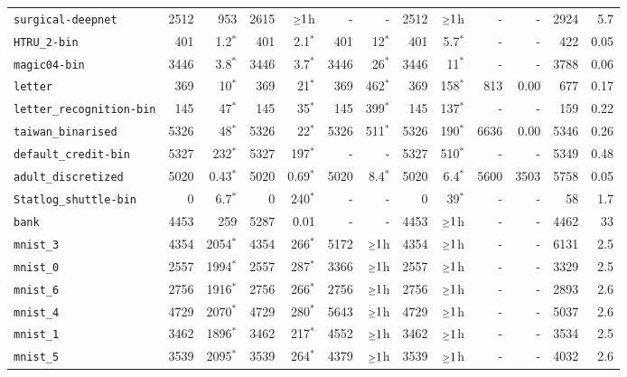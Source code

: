 \begin{tabular}{lrrrrrrrrrrrr}
\texttt{surgical-deepnet} & 2512 & 953 & 2615 & $\mathsmaller{\geq}1$h & - & - & 2512 & $\mathsmaller{\geq}1$h & - & - & 2924 & 5.7\\
\texttt{HTRU\_2-bin} & 401 & 1.2$^*$ & 401 & 2.1$^*$ & 401 & 12$^*$ & 401 & 5.7$^*$ & - & - & 422 & 0.05\\
\texttt{magic04-bin} & 3446 & 3.8$^*$ & 3446 & 3.7$^*$ & 3446 & 26$^*$ & 3446 & 11$^*$ & - & - & 3788 & 0.06\\
\texttt{letter} & 369 & 10$^*$ & 369 & 21$^*$ & 369 & 462$^*$ & 369 & 158$^*$ & 813 & 0.00 & 677 & 0.17\\
\texttt{letter\_recognition-bin} & 145 & 47$^*$ & 145 & 35$^*$ & 145 & 399$^*$ & 145 & 137$^*$ & - & - & 159 & 0.22\\
\texttt{taiwan\_binarised} & 5326 & 48$^*$ & 5326 & 22$^*$ & 5326 & 511$^*$ & 5326 & 190$^*$ & 6636 & 0.00 & 5346 & 0.26\\
\texttt{default\_credit-bin} & 5327 & 232$^*$ & 5327 & 197$^*$ & - & - & 5327 & 510$^*$ & - & - & 5349 & 0.48\\
\texttt{adult\_discretized} & 5020 & 0.43$^*$ & 5020 & 0.69$^*$ & 5020 & 8.4$^*$ & 5020 & 6.4$^*$ & 5600 & 3503 & 5758 & 0.05\\
\texttt{Statlog\_shuttle-bin} & 0 & 6.7$^*$ & 0 & 240$^*$ & - & - & 0 & 39$^*$ & - & - & 58 & 1.7\\
\texttt{bank} & 4453 & 259 & 5287 & 0.01 & - & - & 4453 & $\mathsmaller{\geq}1$h & - & - & 4462 & 33\\
\texttt{mnist\_3} & 4354 & 2054$^*$ & 4354 & 266$^*$ & 5172 & $\mathsmaller{\geq}1$h & 4354 & $\mathsmaller{\geq}1$h & - & - & 6131 & 2.5\\
\texttt{mnist\_0} & 2557 & 1994$^*$ & 2557 & 287$^*$ & 3366 & $\mathsmaller{\geq}1$h & 2557 & $\mathsmaller{\geq}1$h & - & - & 3329 & 2.5\\
\texttt{mnist\_6} & 2756 & 1916$^*$ & 2756 & 266$^*$ & 2756 & $\mathsmaller{\geq}1$h & 2756 & $\mathsmaller{\geq}1$h & - & - & 2893 & 2.6\\
\texttt{mnist\_4} & 4729 & 2070$^*$ & 4729 & 280$^*$ & 5643 & $\mathsmaller{\geq}1$h & 4729 & $\mathsmaller{\geq}1$h & - & - & 5037 & 2.6\\
\texttt{mnist\_1} & 3462 & 1896$^*$ & 3462 & 217$^*$ & 4552 & $\mathsmaller{\geq}1$h & 3462 & $\mathsmaller{\geq}1$h & - & - & 3534 & 2.5\\
\texttt{mnist\_5} & 3539 & 2095$^*$ & 3539 & 264$^*$ & 4379 & $\mathsmaller{\geq}1$h & 3539 & $\mathsmaller{\geq}1$h & - & - & 4032 & 2.6\\

\end{tabular}
